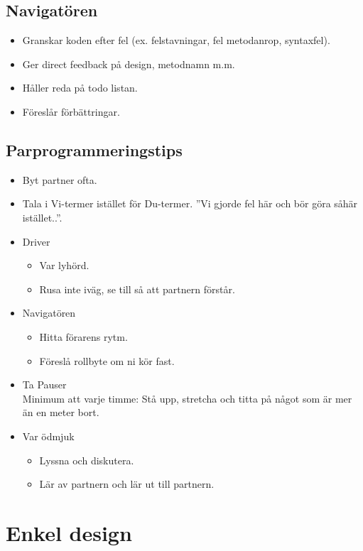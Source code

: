 \documentclass[a4paper]{article}
\begin{document}
\subsection*{Navigatören}
\begin{itemize}
\item{Granskar koden efter fel (ex. felstavningar, fel metodanrop, syntaxfel).}
\item{Ger direct feedback på design, metodnamn m.m.}
\item{Håller reda på todo listan.}
\item{Föreslår förbättringar.}
\end{itemize}

\subsection{Parprogrammeringstips}
\begin{itemize}
\item{Byt partner ofta.}
\item{Tala i Vi-termer istället för Du-termer. ''Vi gjorde fel här och bör göra såhär istället..''.}
\item{Driver 
	\begin{itemize}
	\item{Var lyhörd.}
	\item{Rusa inte iväg, se till så att partnern förstår.}
	\end{itemize}
	}
\item{Navigatören
	\begin{itemize}
	\item{Hitta förarens rytm.}
	\item{Föreslå rollbyte om ni kör fast.}
	\end{itemize}
	}
\item{Ta Pauser \\
	Minimum att varje timme: Stå upp, stretcha och titta på något som är mer än en meter bort.}
\item{Var ödmjuk \begin{itemize}
	\item{Lyssna och diskutera.}
	\item{Lär av partnern och lär ut till partnern.}
	\end{itemize}}
\end{itemize}
\section{Enkel design} %
\end{document}
